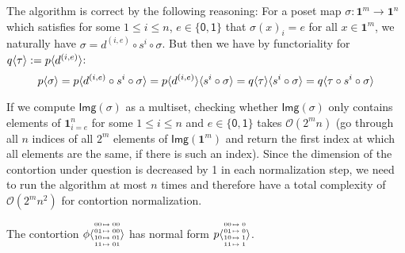 \documentclass[11pt]{article}
\theoremstyle{definition}
\newcommand{\continuation}{??}
\newenvironment{examplecontd}[1]
{\renewcommand{\continuation}{\ref{#1}}\expcont[continued]}
{\endexpcont}
\newcommand{\todo}[1]{
  \begin{tcolorbox}
    TODO {#1} 
  \end{tcolorbox}
}
\newcommand{\mdef}{:=}
\newcommand{\pint}[1]{\mathbf{1}^{#1}}
\newcommand{\pintrestr}[3]{\mathbf{1}^{#1}_{{#2}={#3}}}
\newcommand{\izero}{\mathsf{0}}
\newcommand{\ione}{\mathsf{1}}
\newcommand{\image}[1]{\textsf{Img}({#1})}
\renewcommand{\dim}[1]{\mathsf{dim}({#1})}
\newcommand{\smap}[1]{s^{{#1}}}
\newcommand{\dmap}[2]{d^{({#1} , {#2})}}
\newcommand{\cont}[2]{\ensuremath{ \ifthenelse{\equal{#2}{}}{#1}{{#1}\langle{#2}\rangle}} }
\newcommand{\comp}[2]{\mathsf{Comp}({#1}\ {#2})}
\newcommand{\substfour}[4]{\tiny
  \arraycolsep=.4pt\def\arraystretch{1}
  \begin{array}{ll}
    00 &\mapsto {#1} \\
    01 &\mapsto {#2} \\
    10 &\mapsto {#3} \\
    11 &\mapsto {#4} 
  \end{array}
}
\begin{document}
The algorithm is correct by the following reasoning: For a poset map $\sigma :
\pint{m} \to \pint{n}$ which satisfies for some $1 \leq i \leq n$, $e \in
\{\izero, \ione\}$ that $\sigma(x)_i = e$ for all $x \in \pint{m}$, we naturally
have $\sigma = \dmap{i}{e} \circ \smap{i} \circ \sigma$.
But then we have by functoriality for $\cont{q}{\tau} \mdef \cont{p}{\dmap{i}{e}}$:
$$\cont{p}{\sigma} = \cont{p}{\dmap{i}{e} \circ \smap{i} \circ \sigma} =
\cont{\cont{p}{\dmap{i}{e}}}{\smap{i} \circ \sigma} =
\cont{\cont{q}{\tau}}{\smap{i} \circ \sigma} = \cont{q}{\tau \circ \smap{i} \circ \sigma}$$


If we compute $\image{\sigma}$ as a multiset, checking whether 
$\image{\sigma}$ only contains elements of $\pintrestr{n}{i}{e}$ for
some $1 \leq i \leq n$ and $e \in \{\izero,\ione\}$ takes $\mathcal{O}(2^mn)$
(go through all $n$ indices of all $2^m$ elements of $\image{\pint{m}}$ and
return the first index at which all elements are the same, if there is such an index).
Since the dimension of the contortion under question is decreased by 1 in each
normalization step, we need to run the algorithm at most $n$ times and therefore
have a total complexity of $\mathcal{O}(2^mn^2)$ for contortion normalization.

\begin{examplecontd}{exp:triangle}
  The contortion $\cont{\phi}{\substfour{00}{00}{01}{01}}$ has normal form $\cont{p}{\substfour{0}{0}{1}{1}}$.
\end{examplecontd}




\end{document}
